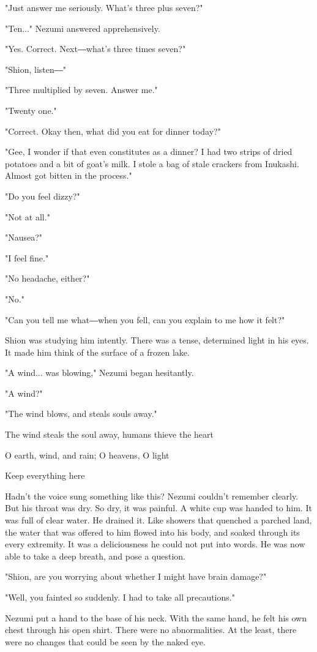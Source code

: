 "Just answer me seriously. What's three plus seven?"

"Ten..." Nezumi answered apprehensively.

"Yes. Correct. Next―what's three times seven?"

"Shion, listen―"

"Three multiplied by seven. Answer me."

"Twenty one."

"Correct. Okay then, what did you eat for dinner today?"

"Gee, I wonder if that even constitutes as a dinner? I had two strips of
dried potatoes and a bit of goat's milk. I stole a bag of stale crackers
from Inukashi. Almost got bitten in the process."

"Do you feel dizzy?"

"Not at all."

"Nausea?"

"I feel fine."

"No headache, either?"

"No."

"Can you tell me what―when you fell, can you explain to me how it felt?"

Shion was studying him intently. There was a tense, determined light in
his eyes. It made him think of the surface of a frozen lake.

"A wind... was blowing," Nezumi began hesitantly.

"A wind?"

"The wind blows, and steals souls away."

The wind steals the soul away, humans thieve the heart

O earth, wind, and rain; O heavens, O light

Keep everything here

Hadn't the voice sung something like this? Nezumi couldn't remember
clearly. But his throat was dry. So dry, it was painful. A white cup was
handed to him. It was full of clear water. He drained it. Like showers
that quenched a parched land, the water that was offered to him flowed
into his body, and soaked through its every extremity. It was a
deliciousness he could not put into words. He was now able to take a
deep breath, and pose a question.

"Shion, are you worrying about whether I might have brain damage?"

"Well, you fainted so suddenly. I had to take all precautions."

Nezumi put a hand to the base of his neck. With the same hand, he felt
his own chest through his open shirt. There were no abnormalities. At
the least, there were no changes that could be seen by the naked eye.

